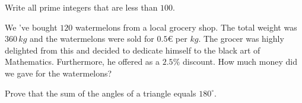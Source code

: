 \begin{exercise}
\item  Write all prime integers that are less than $100$.
\item We 've bought $120$ watermelons from a local grocery shop. The total weight was $360\, kg$ and the watermelons were sold for $0.5\euro$ per $kg$. The grocer was highly delighted from this and decided to dedicate himself to the black art of Mathematics. Furthermore, he offered as a $2.5\%$ discount. How much money did we gave for the watermelons?
\item Prove that the sum of the angles of a triangle equals $180^\circ$.
\end{exercise}
